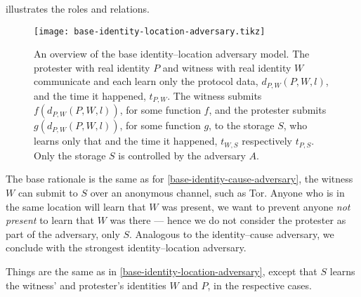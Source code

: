  illustrates the roles and relations.

\begin{figure}
  \centering
  \texttt{[image: base-identity-location-adversary.tikz]}
  \caption{\label{fig:identity-location-adversary}%
    An overview of the base identity--location adversary model.
    The protester with real identity \(P\) and witness with real identity \(W\) 
    communicate and each learn only the protocol data, \(d_{P,W}(P, W, l)\), 
    and the time it happened, \(t_{P,W}\).
    The witness submits \(f(d_{P,W}(P, W, l))\), for some function \(f\), and 
    the protester submits \(g(d_{P,W}(P, W, l))\), for some function \(g\), to 
    the storage \(S\), who learns only that and the time it happened, 
    \(t_{W,S}\) respectively \(t_{P,S}\).
    Only the storage \(S\) is controlled by the adversary \(A\).
  }
\end{figure}

The base rationale is the same as for \cref{base-identity-cause-adversary}, the 
witness \(W\) can submit to \(S\) over an anonymous channel, such as \ac{Tor}.
Anyone who is in the same location will learn that \(W\) was present, we want 
to prevent anyone \emph{not present} to learn that \(W\) was there --- hence we 
do not consider the protester as part of the adversary, only \(S\).
Analogous to the identity--cause adversary, we conclude with the strongest 
identity--location adversary.

\begin{definition}%
  \label{strongest-identity-location-adversary}
  Things are the same as in \cref{base-identity-location-adversary}, except 
  that \(S\) learns the witness' and protester's identities \(W\) and \(P\), in 
  the respective cases.
\end{definition}
